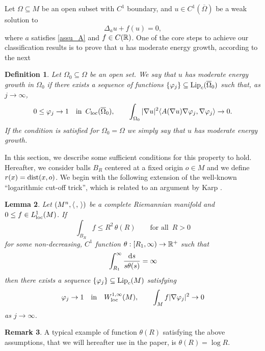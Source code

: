 \documentclass[10 pt,a4paper]{article}
\newtheorem{definition}{Definition}
\newtheorem{lemma}[definition]{Lemma}
\theoremstyle{definition}
\newtheorem{remark}[definition]{Remark}
\begin{document}
Let $\Omega \subseteq M$ be an open subset with $C^1$ boundary, and $u \in C^1(\overline\Omega)$ be a weak solution to 
\[
\Delta_a u + f(u) = 0,
\]
where $a$ satisfies \eqref{assu_A} and $f \in C(\mathbb R)$. 
One of the core steps to achieve our classification results is to prove that $u$ has moderate energy growth, according to the next

\begin{definition}
	Let $\Omega_0\subseteq\Omega$ be an open set. We say that $u$ has \emph{moderate energy growth in $\Omega_0$} if there exists a sequence of functions $\{\varphi_j\} \subseteq \mathrm{Lip}_c(\overline{\Omega}_0)$ such that, as $j \to \infty$, 
	\[
		0 \le \varphi_j \to 1 \quad \text{in } \, C_{\mathrm{loc}}(\overline{\Omega}_0), \qquad \int_{\Omega_0} |\nabla u|^2 \langle A(\nabla u) \nabla \varphi_j, \nabla \varphi_j \rangle \to 0 .
	\]
	If the condition is satisfied for $\Omega_0 = \Omega$ we simply say that $u$ has moderate energy growth.
\end{definition}

In this section, we describe some sufficient conditions for this property to hold. Hereafter, we consider balls $B_R$ centered at a fixed origin $o \in M$ and we define $r(x) = {\rm dist}(x,o)$. We begin with the following extension of the well-known ``logarithmic cut-off trick'', which is related to an argument by Karp \cite{karp}.

\begin{lemma} \label{lem_phij}
	Let $(M^n,\langle \, , \, \rangle)$ be a complete Riemannian manifold and $0\leq f\in L^1_{\mathrm{loc}}(M)$. If
	\[
	\int_{B_R} f \leq R^2 \, \theta(R) \qquad \text{for all } \, R > 0
	\]
	for some non-decreasing, $C^1$ function $\theta : [R_1,\infty) \to \mathbb R^+$ such that
	\[
	\int_{R_1}^\infty \frac{\mathrm{d} s}{s \theta(s)} = \infty
	\]
	then there exists a sequence $\{\varphi_j\} \subseteq \mathrm{Lip}_c(M)$ satisfying
	\[
	\varphi_j \to 1 \quad \text{in} \quad W^{1,\infty}_{\mathrm{loc}}(M) , \qquad \int_M f |\nabla\varphi_j|^2 \to 0
	\]
	as $j\to\infty$.
\end{lemma}

\begin{remark}
	A typical example of function $\theta(R)$ satisfying the above assumptions, that we will hereafter use in the paper, is $\theta(R) = \log R$.	
\end{remark}
\end{document}
